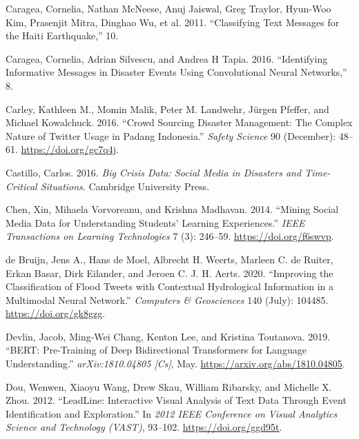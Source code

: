 \documentclass[a4paper, notitlepage]{extreport}
\newlength{\cslhangindent}
\newenvironment{CSLReferences}[2] %
 {%
  \setlength{\parindent}{0pt}
  \ifodd #1 \everypar{\setlength{\hangindent}{\cslhangindent}}\ignorespaces\fi
  \ifnum #2 > 0
  \setlength{\parskip}{#2\baselineskip}
  \fi
 }%
 {}
\begin{document}
\begin{CSLReferences}{1}{0}
\leavevmode{}%
Caragea, Cornelia, Nathan McNeese, Anuj Jaiswal, Greg Traylor, Hyun-Woo
Kim, Prasenjit Mitra, Dinghao Wu, et al. 2011. {``Classifying {Text
Messages} for the {Haiti Earthquake},''} 10.

\leavevmode{}%
Caragea, Cornelia, Adrian Silvescu, and Andrea H Tapia. 2016.
{``Identifying {Informative Messages} in {Disaster Events} Using
{Convolutional Neural Networks},''} 8.

\leavevmode{}%
Carley, Kathleen M., Momin Malik, Peter M. Landwehr, Jürgen Pfeffer, and
Michael Kowalchuck. 2016. {``Crowd Sourcing Disaster Management: {The}
Complex Nature of {Twitter} Usage in {Padang Indonesia}.''} \emph{Safety
Science} 90 (December): 48--61. \url{https://doi.org/gc7q4j}.

\leavevmode{}%
Castillo, Carlos. 2016. \emph{Big Crisis Data: Social Media in Disasters
and Time-Critical Situations}. {Cambridge University Press}.

\leavevmode{}%
Chen, Xin, Mihaela Vorvoreanu, and Krishna Madhavan. 2014. {``Mining
{Social Media Data} for {Understanding Students}' {Learning
Experiences}.''} \emph{IEEE Transactions on Learning Technologies} 7
(3): 246--59. \url{https://doi.org/f6swvp}.

\leavevmode{}%
de Bruijn, Jens A., Hans de Moel, Albrecht H. Weerts, Marleen C. de
Ruiter, Erkan Basar, Dirk Eilander, and Jeroen C. J. H. Aerts. 2020.
{``Improving the Classification of Flood Tweets with Contextual
Hydrological Information in a Multimodal Neural Network.''}
\emph{Computers \& Geosciences} 140 (July): 104485.
\url{https://doi.org/gk8gzg}.

\leavevmode{}%
Devlin, Jacob, Ming-Wei Chang, Kenton Lee, and Kristina Toutanova. 2019.
{``{BERT}: {Pre}-Training of {Deep Bidirectional Transformers} for
{Language Understanding}.''} \emph{arXiv:1810.04805 {[}Cs{]}}, May.
\url{https://arxiv.org/abs/1810.04805}.

\leavevmode{}%
Dou, Wenwen, Xiaoyu Wang, Drew Skau, William Ribarsky, and Michelle X.
Zhou. 2012. {``{LeadLine}: {Interactive} Visual Analysis of Text Data
Through Event Identification and Exploration.''} In \emph{2012 {IEEE
Conference} on {Visual Analytics Science} and {Technology} ({VAST})},
93--102. \url{https://doi.org/ggd95t}.


\end{CSLReferences}
\end{document}
